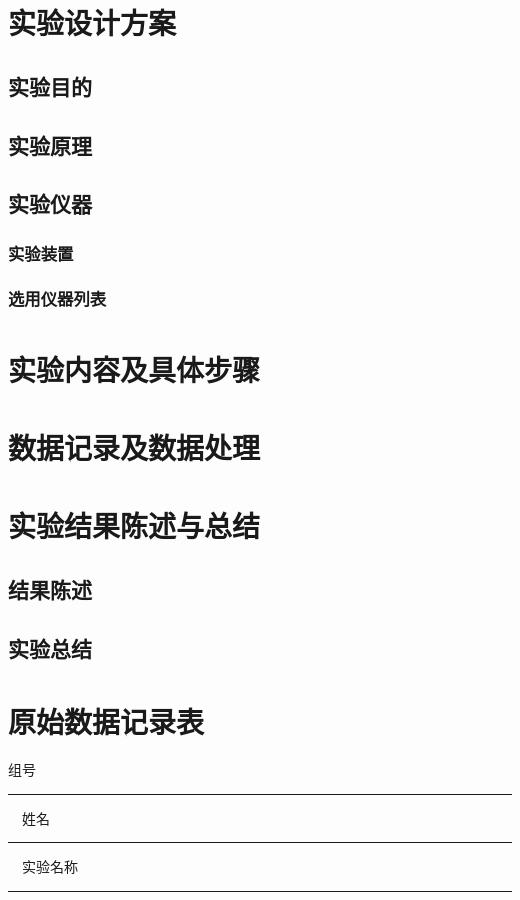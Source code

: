 \documentclass[a4paper,zihao=5,UTF8,fontset=fandol]{phyreport}
\begin{document}
\phyExpCover


\fancypage{\fbox}{} %

\section{实验设计方案}

\subsection{实验目的}

\subsection{实验原理}

\subsection{实验仪器}

\subsubsection{实验装置}

\subsubsection{选用仪器列表}

\smartLongLine
\section{实验内容及具体步骤}

\smartLongLine
\section{数据记录及数据处理}

\smartLongLine
\section{实验结果陈述与总结}

\subsection{结果陈述}

\subsection{实验总结}

\endBox


\newpage
\thispagestyle{empty}

\fancypage{ }{}
\section*{原始数据记录表}

\noindent 组号 \rule[-5pt]{2cm}{0.4pt} \ \ 姓名 \rule[-5pt]{2cm}{0.4pt} \ \ 实验名称 \rule[-5pt]{5cm}{0.4pt}
\end{document}
